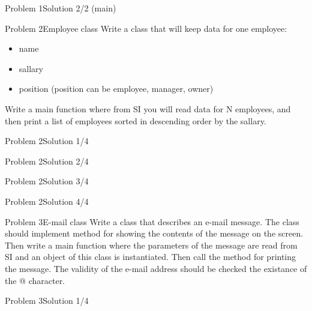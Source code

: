\begin{frame}[fragile]{Problem 1}{Solution 2/2 (main)}

\end{frame}

\begin{frame}{Problem 2}{Employee class}
Write a class that will keep data for one employee:
\begin{itemize}
  \item name
  \item sallary
  \item position (position can be employee, manager, owner)
\end{itemize}
Write a main function where from SI you will read data for N employees, and then
print a list of employees sorted in descending order by the sallary.
\end{frame}

\begin{frame}[fragile]{Problem 2}{Solution 1/4}

\end{frame}

\begin{frame}[fragile]{Problem 2}{Solution 2/4}

\end{frame}

\begin{frame}[fragile]{Problem 2}{Solution 3/4}

\end{frame}

\begin{frame}[fragile]{Problem 2}{Solution 4/4}

\end{frame}

\begin{frame}{Problem 3}{E-mail class}
Write a class that describes an e-mail message. The class should implement
method for showing the contents of the message on the screen.\\
Then write a main function where the parameters of the message are read from SI
and an object of this class is instantiated. Then call the method for printing
the message. The validity of the e-mail address should be checked the existance
of the @ character.
\end{frame}

\begin{frame}[fragile]{Problem 3}{Solution 1/4}

\end{frame}

